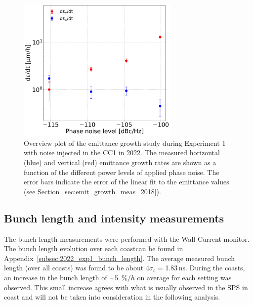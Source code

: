 \begin{figure}[!h] 
     \centering         
   \includegraphics[width=0.7\textwidth]{images/Ch8/emit_H_and_V_noise_scan.png}
       \caption{Overview plot of the emittance growth study during Experiment 1 with noise injected in the CC1 in 2022. The measured horizontal (blue) and vertical (red) emittance growth rates are shown as a function of the different power levels of applied phase noise. The error bars indicate the error of the linear fit to the emittance values (see Section~\ref{sec:emit_growth_meas_2018}).}
       \label{fig:H_V_emit_growth_noise_scan}
\end{figure}

\subsection{Bunch length and intensity measurements}\label{sec:bunch_length_intensity_2022}

The bunch length measurements were performed with the Wall Current monitor. The bunch length evolution over each coastcan be found in Appendix~\ref{subsec:2022_exp1_bunch_length}. The average measured bunch length (over all coasts) was found to be about $4\sigma_t$ = 1.83\,ns. During the coasts, an increase in the bunch length of $\sim$5~$\%/h$ on average for each setting was observed. This small increase agrees with what is usually observed in the SPS in coast and will not be taken into consideration in the following analysis. 


